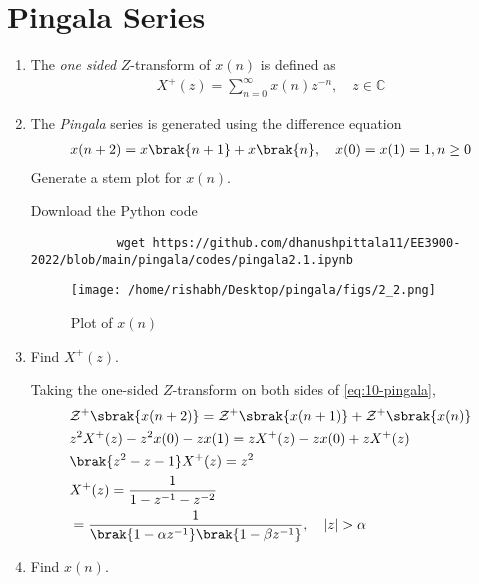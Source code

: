 \documentclass[journal,12pt,twocolumn]{IEEEtran}
\renewcommand\thesection{\arabic{section}}
\begin{document}
	\section{Pingala Series}
	\begin{enumerate}[label=\thesection.\arabic*,ref=\thesection.\theenumi]
		\item The {\em one sided} $Z$-transform of $x(n)$ is defined as 
		\begin{align}
			X^{+}(z) = \sum_{n = 0}^{\infty}x(n)z^{-n}, \quad z \in \mathbb{C}
			\label{eq:one-Z}
		\end{align}
		\item The {\em Pingala} series is generated using the difference equation 
		\begin{align}
			x(n+2) = x\brak{n+1} + x\brak{n},  \quad x(0) = x(1) = 1, n \ge 0
			\label{eq:10-pingala}
		\end{align}
		Generate a stem plot for $x(n)$.
		
		\solution
		Download the Python code
		\begin{lstlisting}
			wget https://github.com/dhanushpittala11/EE3900-2022/blob/main/pingala/codes/pingala2.1.ipynb
		\end{lstlisting}
		\begin{figure}[!htp]
			\texttt{[image: /home/rishabh/Desktop/pingala/figs/2\_2.png]}
			\caption{Plot of $x(n)$}
			\label{fig:xn}
		\end{figure}
		
		\newpage
		\item Find $X^{+}(z)$.
		
		\solution Taking the one-sided $Z$-transform on both sides of \eqref{eq:10-pingala},
		\begin{align}
			&\mathcal{Z}^+\sbrak{x(n + 2)} = \mathcal{Z}^+\sbrak{x(n + 1)} + \mathcal{Z}^+\sbrak{x(n)} \\
			&z^2X^+(z) - z^2x(0) - zx(1) = zX^+(z) - zx(0) + zX^+(z) \\
			&\brak{z^2 - z - 1}X^+(z) = z^2 \\
			&X^+(z) = \frac{1}{1 - z^{-1} - z^{-2}} \\
			&= \frac{1}{\brak{1 - \alpha z^{-1}}\brak{1 - \beta z^{-1}}}, \quad |z| > \alpha
			\label{eq:X-z}
		\end{align}
		\item Find $x(n)$.
		

\end{enumerate}
\end{document}
